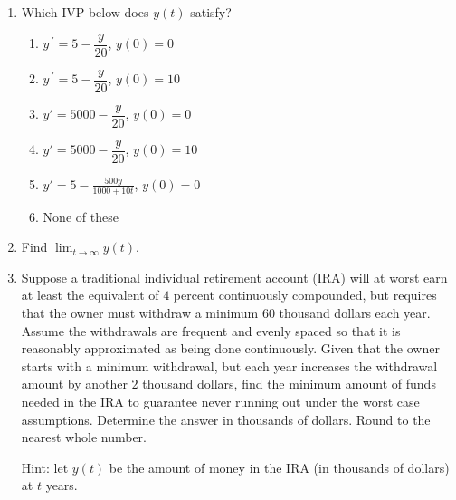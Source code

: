 \documentclass{ximera}
\begin{document}
\begin{enumerate}[label=(\arabic*)]

\item  Which IVP below does $y(t)$ satisfy?

\begin{enumerate}[label=(\alph*)]
\item $y\,^{\prime}=5-\dfrac{y}{20}$, $y(0)=0$ %
\item $y\,^{\prime}=5-\dfrac{y}{20}$, $y(0)=10$ 
\item $y'=5000-\dfrac{y}{20}$, $y(0)=0$
\item $y'=5000-\dfrac{y}{20}$, $y(0)=10$
\item $\displaystyle y'=5-\frac{500y}{1000+10t}$, $y(0)=0$
\item None of these
\end{enumerate}


\item Find $\displaystyle \lim_{t\rightarrow \infty} y(t)$.  




\newpage

\item Suppose a traditional individual retirement account (IRA) will at worst earn at least the equivalent of $4$ percent continuously compounded, but requires that the owner must withdraw a minimum $60$ thousand dollars each year. Assume the withdrawals are frequent and evenly spaced so that it is reasonably approximated as being done continuously.  Given that the owner starts with a minimum withdrawal, but each year increases the withdrawal amount by another $2$ thousand dollars, find the minimum amount of funds needed in the IRA to guarantee never running out under the worst case assumptions.  Determine the answer in thousands of dollars. Round to the nearest whole number.

   Hint:  let $y(t)$ be the amount of money in the IRA (in thousands of dollars) at $t$ years.








\end{enumerate}
\end{document}

